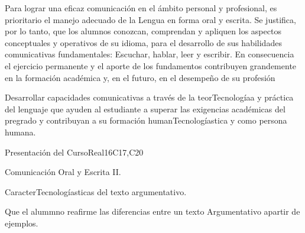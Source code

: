 \begin{syllabus}


\begin{justification}
Para lograr una eficaz comunicación en el ámbito personal y profesional, es prioritario el manejo adecuado de la Lengua en forma oral y escrita. Se justifica, por lo tanto, que los alumnos  conozcan, comprendan y apliquen los aspectos conceptuales y operativos de su idioma, para el desarrollo de sus habilidades comunicativas fundamentales: Escuchar, hablar, leer y escribir.
En consecuencia el ejercicio permanente y el aporte de los fundamentos contribuyen grandemente en la formación académica y, en el futuro, en el desempeño de su profesión
\end{justification}

\begin{goals}
\item Desarrollar capacidades comunicativas a través de la teorTecnologíaa y práctica del lenguaje que ayuden al estudiante a superar las exigencias académicas del pregrado y contribuyan a su formación humanTecnologíastica y como persona humana.
\end{goals}

\begin{outcomes}
   \item {}
   \item {}
   \item {}
\end{outcomes}

\begin{competences}
    \item {}
    \item {}
    \item {}
\end{competences}

\begin{unit}{Presentación del Curso}{}{Real}{16}{C17,C20}
  \begin{topics}
      \item Comunicación Oral y Escrita II.
      \item CaracterTecnologíasticas del texto argumentativo.
  \end{topics}

  \begin{learningoutcomes}
   \item Que el alummno reafirme las diferencias entre un texto Argumentativo apartir de ejemplos.
  \end{learningoutcomes}
\end{unit}


\end{syllabus}
